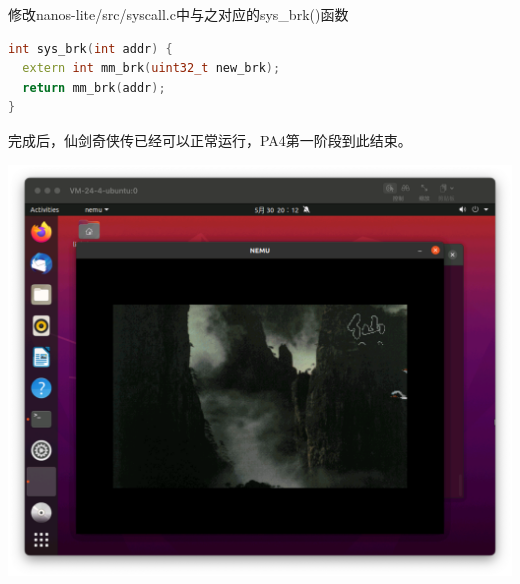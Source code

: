 \documentclass[UTF8,a4paper,10pt]{ctexart}
\begin{document}
修改nanos-lite/src/syscall.c中与之对应的sys\_brk()函数
\begin{lstlisting}[language = C++]
int sys_brk(int addr) {
  extern int mm_brk(uint32_t new_brk);
  return mm_brk(addr);
}
\end{lstlisting}
完成后，仙剑奇侠传已经可以正常运行，PA4第一阶段到此结束。
\begin{center}
  \includegraphics*[scale = 0.4]{img/8}
\end{center}































\end{document}
